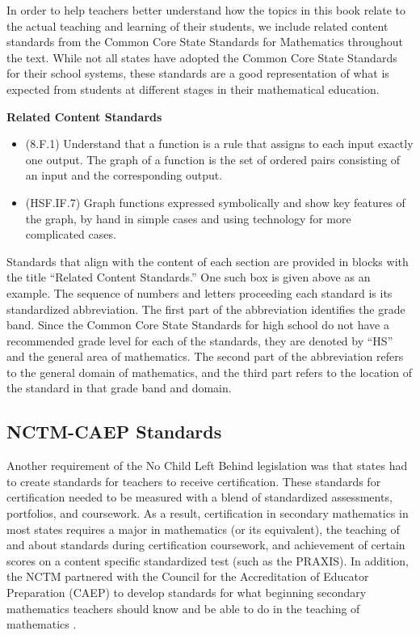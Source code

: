 \documentclass[
]{book}
\providecommand{\tightlist}{%
  \setlength{\itemsep}{0pt}\setlength{\parskip}{0pt}}
\newenvironment{standards}{}{}
\theoremstyle{definition}
\theoremstyle{definition}
\theoremstyle{definition}
\theoremstyle{definition}
\theoremstyle{remark}
\begin{document}
In order to help teachers better understand how the topics in this book relate to the actual teaching and learning of their students, we include related content standards from the Common Core State Standards for Mathematics throughout the text. While not all states have adopted the Common Core State Standards for their school systems, these standards are a good representation of what is expected from students at different stages in their mathematical education.

\begin{standards}

\begin{center}
\textbf{Related Content Standards}

\end{center}

\begin{itemize}
\tightlist
\item
  (8.F.1) Understand that a function is a rule that assigns to each input exactly one output. The graph of a function is the set of ordered pairs consisting of an input and the corresponding output.
\item
  (HSF.IF.7) Graph functions expressed symbolically and show key features of the graph, by hand in simple cases and using technology for more complicated cases.
\end{itemize}

\end{standards}

Standards that align with the content of each section are provided in blocks with the title ``Related Content Standards.'' One such box is given above as an example. The sequence of numbers and letters proceeding each standard is its standardized abbreviation. The first part of the abbreviation identifies the grade band. Since the Common Core State Standards for high school do not have a recommended grade level for each of the standards, they are denoted by ``HS'' and the general area of mathematics. The second part of the abbreviation refers to the general domain of mathematics, and the third part refers to the location of the standard in that grade band and domain.

\hypertarget{nctm-caep-standards}{%
\subsection{NCTM-CAEP Standards}\label{nctm-caep-standards}}

Another requirement of the No Child Left Behind legislation was that states had to create standards for teachers to receive certification. These standards for certification needed to be measured with a blend of standardized assessments, portfolios, and coursework. As a result, certification in secondary mathematics in most states requires a major in mathematics (or its equivalent), the teaching of and about standards during certification coursework, and achievement of certain scores on a content specific standardized test (such as the PRAXIS). In addition, the NCTM partnered with the Council for the Accreditation of Educator Preparation (CAEP) to develop standards for what beginning secondary mathematics teachers should know and be able to do in the teaching of mathematics \citep{CAEP}.
\end{document}
